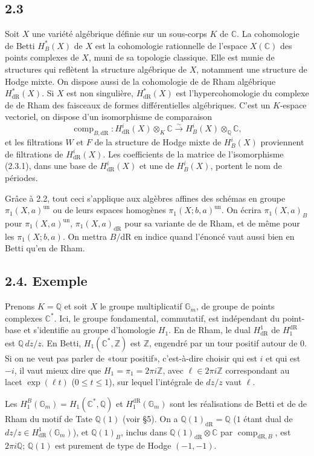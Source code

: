 \documentclass[10pt]{article}
\newcommand{\Q}{\mathbb Q}
\newcommand{\Z}{\mathbb Z}
\newcommand{\C}{\mathbb C}
\newcommand{\Gm}{\mathbb G_m}
\newcommand{\comp}{\operatorname{comp}}
\newcommand{\dR}{\mathrm{dR}}
\begin{document}
\subsection*{2.3}
Soit $X$ une variété algébrique définie sur un sous-corps $K$ de $\C$. La cohomologie de Betti $H_B^*(X)$ de $X$ est la cohomologie rationnelle de l'espace $X(\C)$ des points complexes de $X$, muni de sa topologie classique. Elle est munie de structures qui reflètent la structure algébrique de $X$, notamment une structure de Hodge mixte. On dispose aussi de la cohomologie de de Rham algébrique $H^*_{\dR}(X)$. Si $X$ est non singulière, $H^*_{\dR}(X)$ est l'hypercohomologie du complexe de de Rham des faisceaux de formes différentielles algébriques. C'est un $K$-espace vectoriel, on dispose d'un isomorphisme de comparaison
\begin{equation}
\comp_{B,\dR}:H^i_{\dR}(X)\otimes_K\C\xrightarrow{\sim}H^i_B(X)\otimes_\Q\C,
\tag{2.3.1}
\end{equation}
et les filtrations $W$ et $F$ de la structure de Hodge mixte de $H^i_B(X)$ proviennent de filtrations de $H^i_{\dR}(X)$. Les coefficients de la matrice de l'isomorphisme (2.3.1), dans une base de $H^i_{\dR}(X)$ et une de $H^i_B(X)$, portent le nom de périodes.

Grâce à 2.2, tout ceci s'applique aux algèbres affines des schémas en groupe $\pi_1(X,a)^{\mathrm{un}}$ ou de leurs espaces homogènes $\pi_1(X;b,a)^{\mathrm{un}}$. On écrira $\pi_1(X,a)_B$ pour $\pi_1(X,a)^{\mathrm{un}}$, $\pi_1(X,a)_{\dR}$ pour sa variante de de Rham, et de même pour les $\pi_1(X;b,a)$. On mettra $B/\dR$ en indice quand l'énoncé vaut aussi bien en Betti qu'en de Rham.

\subsection*{2.4. Exemple}
Prenons $K=\Q$ et soit $X$ le groupe multiplicatif $\Gm$, de groupe de points complexes $\C^*$. Ici, le groupe fondamental, commutatif, est indépendant du point-base et s'identifie au groupe d'homologie $H_1$. En de Rham, le dual $H^1_{\dR}$ de $H^{\dR}_1$ est $\Q\,dz/z$. En Betti, $H_1(\C^*,\Z)$ est $\Z$, engendré par un tour positif autour de $0$. Si on ne veut pas parler de «tour positif», c'est-à-dire choisir qui est $i$ et qui est $-i$, il vaut mieux dire que $H_1=\pi_1=2\pi i\Z$, avec $\ell\in2\pi i\Z$ correspondant au lacet $\exp(\ell t)$ ($0\leq t\leq1$), sur lequel l'intégrale de $dz/z$ vaut $\ell$.

Les $H^B_1(\Gm)=H_1(\C^*,\Q)$ et $H^{\dR}_1(\Gm)$ sont les réalisations de Betti et de de Rham du motif de Tate $\Q(1)$ (voir \S5). On a $\Q(1)_{\dR}=\Q$ ($1$ étant dual de $dz/z\in H^1_{\dR}(\Gm)$), et $\Q(1)_B$, inclus dans $\Q(1)_{\dR}\otimes\C$ par $\comp_{\dR,B}$, est $2\pi i\Q$; $\Q(1)$ est purement de type de Hodge $(-1,-1)$.
\end{document}
